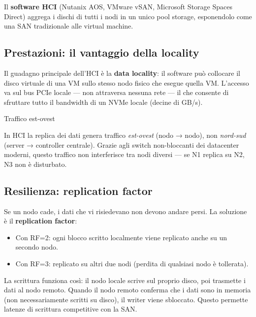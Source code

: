 \documentclass[
  italian,
  openany]{book}
\providecommand{\tightlist}{%
  \setlength{\itemsep}{0pt}\setlength{\parskip}{0pt}}
\begin{document}
Il \textbf{software HCI} (Nutanix AOS, VMware vSAN, Microsoft Storage
Spaces Direct) aggrega i dischi di tutti i nodi in un unico pool
storage, esponendolo come una SAN tradizionale alle virtual machine.

\subsection{Prestazioni: il vantaggio della
locality}\label{prestazioni-il-vantaggio-della-locality}

Il guadagno principale dell'HCI è la \textbf{data locality}: il software
può collocare il disco virtuale di una VM sullo stesso nodo fisico che
esegue quella VM. L'accesso va sul bus PCIe locale --- non attraversa
nessuna rete --- il che consente di sfruttare tutto il bandwidth di un
NVMe locale (decine di GB/s).

\begin{callouttip}{Traffico est-ovest}

In HCI la replica dei dati genera traffico \emph{est-ovest} (nodo →
nodo), non \emph{nord-sud} (server → controller centrale). Grazie agli
switch non-bloccanti dei datacenter moderni, questo traffico non
interferisce tra nodi diversi --- se N1 replica su N2, N3 non è
disturbato.

\end{callouttip}

\subsection{Resilienza: replication
factor}\label{resilienza-replication-factor}

Se un nodo cade, i dati che vi risiedevano non devono andare persi. La
soluzione è il \textbf{replication factor}:

\begin{itemize}
\tightlist
\item
  Con RF=2: ogni blocco scritto localmente viene replicato anche su un
  secondo nodo.
\item
  Con RF=3: replicato su altri due nodi (perdita di qualsiasi nodo è
  tollerata).
\end{itemize}

La scrittura funziona così: il nodo locale scrive sul proprio disco, poi
trasmette i dati al nodo remoto. Quando il nodo remoto conferma che i
dati sono in memoria (non necessariamente scritti su disco), il writer
viene sbloccato. Questo permette latenze di scrittura competitive con la
SAN.
\end{document}
